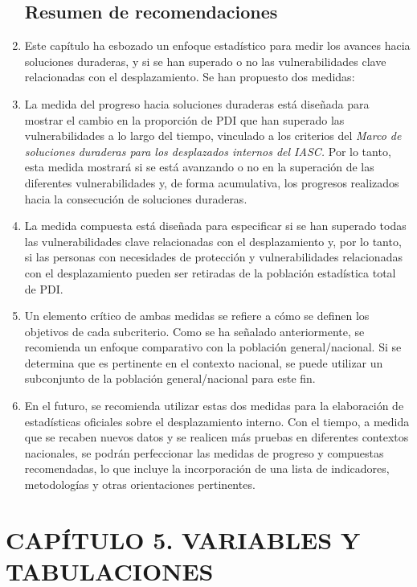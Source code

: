 \documentclass[
]{book}
\begin{document}
\begin{enumerate}
{  \section{Resumen de recomendaciones}\label{resumen-de-recomendaciones-1}}
\item
  Este capítulo ha esbozado un enfoque estadístico para medir los avances hacia soluciones duraderas, y si se han superado o no las vulnerabilidades clave relacionadas con el desplazamiento. Se han propuesto dos medidas:
\item
  La medida del progreso hacia soluciones duraderas está diseñada para mostrar el cambio en la proporción de PDI que han superado las vulnerabilidades a lo largo del tiempo, vinculado a los criterios del \emph{Marco de soluciones duraderas para los desplazados internos del IASC.} Por lo tanto, esta medida mostrará si se está avanzando o no en la superación de las diferentes vulnerabilidades y, de forma acumulativa, los progresos realizados hacia la consecución de soluciones duraderas.
\item
  La medida compuesta está diseñada para especificar si se han superado todas las vulnerabilidades clave relacionadas con el desplazamiento y, por lo tanto, si las personas con necesidades de protección y vulnerabilidades relacionadas con el desplazamiento pueden ser retiradas de la población estadística total de PDI.
\item
  Un elemento crítico de ambas medidas se refiere a cómo se definen los objetivos de cada subcriterio. Como se ha señalado anteriormente, se recomienda un enfoque comparativo con la población general/nacional. Si se determina que es pertinente en el contexto nacional, se puede utilizar un subconjunto de la población general/nacional para este fin.
\item
  En el futuro, se recomienda utilizar estas dos medidas para la elaboración de estadísticas oficiales sobre el desplazamiento interno. Con el tiempo, a medida que se recaben nuevos datos y se realicen más pruebas en diferentes contextos nacionales, se podrán perfeccionar las medidas de progreso y compuestas recomendadas, lo que incluye la incorporación de una lista de indicadores, metodologías y otras orientaciones pertinentes.
\end{enumerate}

\hypertarget{capuxedtulo-5.-variables-y-tabulaciones}{%
\chapter{CAPÍTULO 5. VARIABLES Y TABULACIONES}\label{capuxedtulo-5.-variables-y-tabulaciones}}
\end{document}
